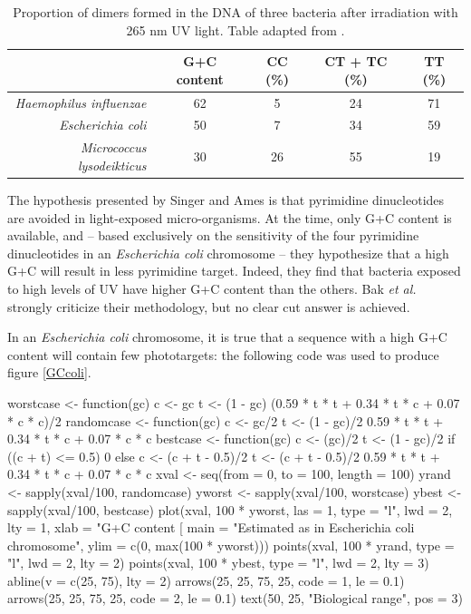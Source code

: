 \documentclass{article}
\begin{document}
\begin{table}[H]
\begin{center}
\begin{tabular}{rcccc}
  \hline \hline
  & G+C content & CC (\%) & CT + TC (\%) & TT (\%)\\
  \hline
  \textit{Haemophilus influenzae} & 62 & 5 & 24 & 71 \\
  \textit{Escherichia coli} & 50 & 7 & 34 & 59 \\
  \textit{Micrococcus lysodeikticus} & 30 & 26 & 55 & 19 \\
  \hline \hline
\end{tabular}
\caption{Proportion of dimers formed in the DNA of three bacteria
  after irradiation with 265 nm UV light. Table adapted from
  \cite{Setlow}.}
\label{sensitivity}
\end{center}
\end{table}



The hypothesis presented by Singer and Ames \cite{Singer} is that
pyrimidine dinucleotides are avoided in light-exposed micro-organisms.
At the time, only G+C content is available, and -- based exclusively
on the sensitivity of the four pyrimidine dinucleotides in an
\textit{Escherichia coli} chromosome -- they hypothesize that a high
G+C will result in less pyrimidine target. Indeed, they find that
bacteria exposed to high levels of UV have higher G+C content than the
others. Bak \textit{et al.} \cite{Bak} strongly criticize their
methodology, but no clear cut answer is achieved.

In an \textit{Escherichia coli} chromosome, it is true that a sequence
with a high G+C content will contain few phototargets: the following
code was used to produce figure \ref{GCcoli}.

\begin{Schunk}
\begin{Sinput}
 worstcase <- function(gc) {
     c <- gc
     t <- (1 - gc)
     (0.59 * t * t + 0.34 * t * c + 0.07 * c * c)/2
 }
 randomcase <- function(gc) {
     c <- gc/2
     t <- (1 - gc)/2
     0.59 * t * t + 0.34 * t * c + 0.07 * c * c
 }
 bestcase <- function(gc) {
     c <- (gc)/2
     t <- (1 - gc)/2
     if ((c + t) <= 0.5) {
         0
     }
     else {
         c <- (c + t - 0.5)/2
         t <- (c + t - 0.5)/2
         0.59 * t * t + 0.34 * t * c + 0.07 * c * c
     }
 }
 xval <- seq(from = 0, to = 100, length = 100)
 yrand <- sapply(xval/100, randomcase)
 yworst <- sapply(xval/100, worstcase)
 ybest <- sapply(xval/100, bestcase)
 plot(xval, 100 * yworst, las = 1, type = "l", lwd = 2, lty = 1, 
     xlab = "G+C content [%
     main = "Estimated as in Escherichia coli chromosome", 
     ylim = c(0, max(100 * yworst)))
 points(xval, 100 * yrand, type = "l", lwd = 2, lty = 2)
 points(xval, 100 * ybest, type = "l", lwd = 2, lty = 3)
 abline(v = c(25, 75), lty = 2)
 arrows(25, 25, 75, 25, code = 1, le = 0.1)
 arrows(25, 25, 75, 25, code = 2, le = 0.1)
 text(50, 25, "Biological range", pos = 3)
\end{Sinput}
\end{Schunk}
\end{document}
